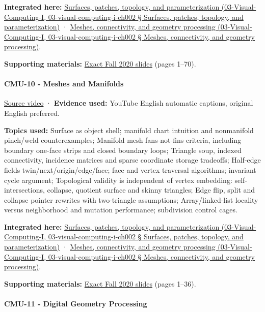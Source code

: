 \textbf{Integrated here:} \href{}{Surfaces, patches, topology, and parameterization (03-Visual-Computing-I, 03-visual-computing-i-ch002 § Surfaces, patches, topology, and parameterization)} · \href{}{Meshes, connectivity, and geometry processing (03-Visual-Computing-I, 03-visual-computing-i-ch002 § Meshes, connectivity, and geometry processing)}.

\textbf{Supporting materials:} \href{https://15462.courses.cs.cmu.edu/fall2020content/lectures/09_introgeometry/09_introgeometry_slides.pdf}{Exact Fall 2020 slides} (pages 1--70).

\paragraph{CMU-10 - Meshes and Manifolds}\label{cmu-10---meshes-and-manifolds}

\href{https://www.youtube.com/watch?v=HePDHsp8spU}{Source video} · \textbf{Evidence used:} YouTube English automatic captions, original English preferred.

\textbf{Topics used:} Surface as object shell; manifold chart intuition and nonmanifold pinch/weld counterexamples; Manifold mesh fans-not-fins criteria, including boundary one-face strips and closed boundary loops; Triangle soup, indexed connectivity, incidence matrices and sparse coordinate storage tradeoffs; Half-edge fields twin/next/origin/edge/face; face and vertex traversal algorithms; invariant cycle argument; Topological validity is independent of vertex embedding: self-intersections, collapse, quotient surface and skinny triangles; Edge flip, split and collapse pointer rewrites with two-triangle assumptions; Array/linked-list locality versus neighborhood and mutation performance; subdivision control cages.

\textbf{Integrated here:} \href{}{Surfaces, patches, topology, and parameterization (03-Visual-Computing-I, 03-visual-computing-i-ch002 § Surfaces, patches, topology, and parameterization)} · \href{}{Meshes, connectivity, and geometry processing (03-Visual-Computing-I, 03-visual-computing-i-ch002 § Meshes, connectivity, and geometry processing)}.

\textbf{Supporting materials:} \href{https://15462.courses.cs.cmu.edu/fall2020content/lectures/10_meshes/10_meshes_slides.pdf}{Exact Fall 2020 slides} (pages 1--36).

\paragraph{CMU-11 - Digital Geometry Processing}\label{cmu-11---digital-geometry-processing}

